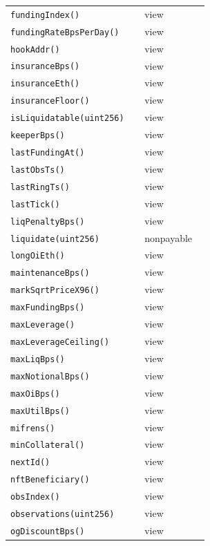 \begin{longtable}{@{}p{0.62\linewidth}p{0.30\linewidth}@{}}
\texttt{\scriptsize fundingIndex()} & view \\
\texttt{\scriptsize fundingRateBpsPerDay()} & view \\
\texttt{\scriptsize hookAddr()} & view \\
\texttt{\scriptsize insuranceBps()} & view \\
\texttt{\scriptsize insuranceEth()} & view \\
\texttt{\scriptsize insuranceFloor()} & view \\
\texttt{\scriptsize isLiquidatable(uint256)} & view \\
\texttt{\scriptsize keeperBps()} & view \\
\texttt{\scriptsize lastFundingAt()} & view \\
\texttt{\scriptsize lastObsTs()} & view \\
\texttt{\scriptsize lastRingTs()} & view \\
\texttt{\scriptsize lastTick()} & view \\
\texttt{\scriptsize liqPenaltyBps()} & view \\
\texttt{\scriptsize liquidate(uint256)} & nonpayable \\
\texttt{\scriptsize longOiEth()} & view \\
\texttt{\scriptsize maintenanceBps()} & view \\
\texttt{\scriptsize markSqrtPriceX96()} & view \\
\texttt{\scriptsize maxFundingBps()} & view \\
\texttt{\scriptsize maxLeverage()} & view \\
\texttt{\scriptsize maxLeverageCeiling()} & view \\
\texttt{\scriptsize maxLiqBps()} & view \\
\texttt{\scriptsize maxNotionalBps()} & view \\
\texttt{\scriptsize maxOiBps()} & view \\
\texttt{\scriptsize maxUtilBps()} & view \\
\texttt{\scriptsize mifrens()} & view \\
\texttt{\scriptsize minCollateral()} & view \\
\texttt{\scriptsize nextId()} & view \\
\texttt{\scriptsize nftBeneficiary()} & view \\
\texttt{\scriptsize obsIndex()} & view \\
\texttt{\scriptsize observations(uint256)} & view \\
\texttt{\scriptsize ogDiscountBps()} & view \\

\end{longtable}
